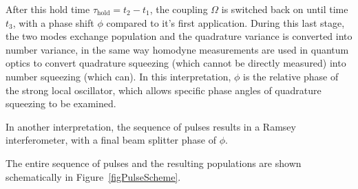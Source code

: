 \documentclass[12pt]{iopart}
\begin{document}
After this hold time $\tau_{\mathrm{hold}} = t_2 - t_1 $, the coupling $\Omega$ is switched back on until time $t_3$, with a phase shift $\phi$ compared to it's first application. During this last stage, the two modes exchange population and the quadrature variance is converted into number variance, in the same way homodyne measurements are used in quantum optics to convert quadrature squeezing (which cannot be directly measured) into number squeezing (which can). In this interpretation, $\phi$ is the relative phase of the strong local oscillator, which allows specific phase angles of quadrature squeezing to be examined.

In another interpretation, the sequence of pulses results in a Ramsey interferometer, with a final beam splitter phase of $\phi$.

The entire sequence of pulses and the resulting populations are shown schematically in Figure~\ref{figPulseScheme}.
\end{document}
